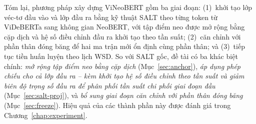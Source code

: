 Tóm lại, phương pháp xây dựng ViNeoBERT gồm ba giai đoạn: (1)~khởi tạo lớp véc-tơ đầu vào và lớp đầu ra bằng kỹ thuật SALT theo từng token từ ViDeBERTa sang không gian NeoBERT, với tập điểm neo
được mở rộng bằng cặp dịch và hệ số điều chỉnh đầu ra khởi tạo theo tần suất; (2)~căn chỉnh với phần thân đóng
băng để hai ma trận mới ổn định cùng phần thân; và (3)~tiếp tục tiền huấn luyện
theo lịch WSD. So với SALT gốc, đề tài có ba khác biệt chính: \textit{mở rộng tập điểm neo bằng
cặp dịch} (Mục~\ref{sec:anchor}), \textit{áp dụng phép chiếu cho cả lớp đầu ra --
kèm khởi tạo hệ số điều chỉnh theo tần suất và giảm biên độ trọng số đầu ra để phân phối tần suất chi phối giai đoạn
đầu} (Mục~\ref{sec:salt-proj}), và \textit{bổ sung giai đoạn căn chỉnh với phần thân đóng băng}
(Mục~\ref{sec:freeze}). Hiệu quả của các thành phần này được đánh giá trong
Chương~\ref{chap:experiment}.
